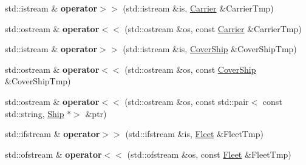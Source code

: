\begin{DoxyCompactItemize}
std\+::istream \& {\bfseries operator$>$$>$} (std\+::istream \&is, \mbox{\hyperlink{class_aircraft_carrier_group_1_1_carrier}{Carrier}} \&Carrier\+Tmp)
\item 
\mbox{\label{namespace_aircraft_carrier_group_ab8fbe9afd8dfc9641502d161226cc2e8}} 
std\+::ostream \& {\bfseries operator$<$$<$} (std\+::ostream \&os, const \mbox{\hyperlink{class_aircraft_carrier_group_1_1_carrier}{Carrier}} \&Carrier\+Tmp)
\item 
\mbox{\label{namespace_aircraft_carrier_group_abb71ecf9d793b33322cb112051a66232}} 
std\+::istream \& {\bfseries operator$>$$>$} (std\+::istream \&is, \mbox{\hyperlink{class_aircraft_carrier_group_1_1_cover_ship}{Cover\+Ship}} \&Cover\+Ship\+Tmp)
\item 
\mbox{\label{namespace_aircraft_carrier_group_a8fee94b9f1245a2f7ba4ad8dcc61cd72}} 
std\+::ostream \& {\bfseries operator$<$$<$} (std\+::ostream \&os, const \mbox{\hyperlink{class_aircraft_carrier_group_1_1_cover_ship}{Cover\+Ship}} \&Cover\+Ship\+Tmp)
\item 
\mbox{\label{namespace_aircraft_carrier_group_a9f43a9994a583702541778ae23677677}} 
std\+::ostream \& {\bfseries operator$<$$<$} (std\+::ostream \&os, const std\+::pair$<$ const std\+::string, \mbox{\hyperlink{class_aircraft_carrier_group_1_1_ship}{Ship}} $\ast$$>$ \&ptr)
\item 
\mbox{\label{namespace_aircraft_carrier_group_a6e801e9f18142a151bbd3740162b3b0a}} 
std\+::ifstream \& {\bfseries operator$>$$>$} (std\+::ifstream \&is, \mbox{\hyperlink{class_aircraft_carrier_group_1_1_fleet}{Fleet}} \&Fleet\+Tmp)
\item 
\mbox{\label{namespace_aircraft_carrier_group_a1d4a32e23093ecd31e69d403e87a8cad}} 
std\+::ofstream \& {\bfseries operator$<$$<$} (std\+::ofstream \&os, const \mbox{\hyperlink{class_aircraft_carrier_group_1_1_fleet}{Fleet}} \&Fleet\+Tmp)
\item 
\mbox{\label{namespace_aircraft_carrier_group_a041b295ea5def9c25a529ac316c266ef}} 
$$
\end{DoxyCompactItemize}
